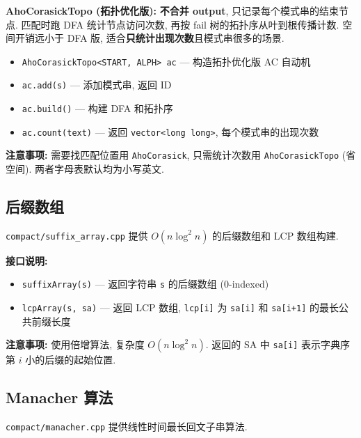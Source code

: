 \documentclass[a4paper]{ctexbook}
\begin{document}
\textbf{AhoCorasickTopo (拓扑优化版):} \textbf{不合并 output}, 只记录每个模式串的结束节点. 匹配时跑 DFA 统计节点访问次数, 再按 fail 树的拓扑序从叶到根传播计数. 空间开销远小于 DFA 版, 适合\textbf{只统计出现次数}且模式串很多的场景.

\begin{itemize}
	\item \texttt{AhoCorasickTopo<START, ALPH> ac} — 构造拓扑优化版 AC 自动机
	\item \texttt{ac.add(s)} — 添加模式串, 返回 ID
	\item \texttt{ac.build()} — 构建 DFA 和拓扑序
	\item \texttt{ac.count(text)} — 返回 \texttt{vector<long long>}, 每个模式串的出现次数
\end{itemize}

\textbf{注意事项:} 需要找匹配位置用 \texttt{AhoCorasick}, 只需统计次数用 \texttt{AhoCorasickTopo} (省空间). 两者字母表默认均为小写英文.



\subsection{后缀数组}

\texttt{compact/suffix\_array.cpp} 提供 $O(n \log^2 n)$ 的后缀数组和 LCP 数组构建.

\textbf{接口说明:}
\begin{itemize}
	\item \texttt{suffixArray(s)} — 返回字符串 \texttt{s} 的后缀数组 (0-indexed)
	\item \texttt{lcpArray(s, sa)} — 返回 LCP 数组, \texttt{lcp[i]} 为 \texttt{sa[i]} 和 \texttt{sa[i+1]} 的最长公共前缀长度
\end{itemize}

\textbf{注意事项:} 使用倍增算法, 复杂度 $O(n \log^2 n)$. 返回的 SA 中 \texttt{sa[i]} 表示字典序第 $i$ 小的后缀的起始位置.



\subsection{Manacher 算法}

\texttt{compact/manacher.cpp} 提供线性时间最长回文子串算法.
\end{document}
